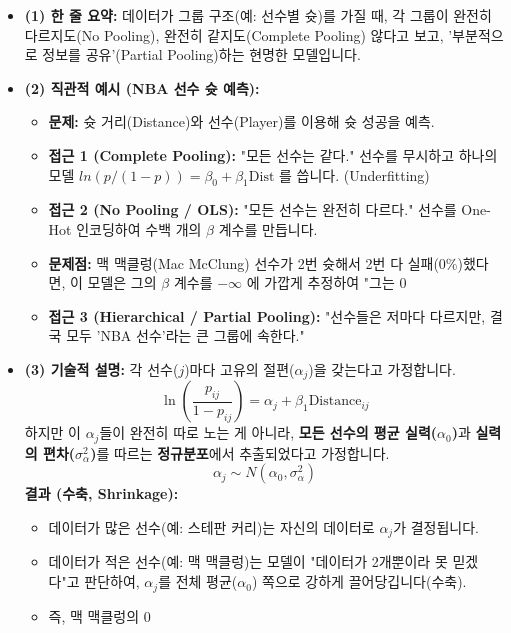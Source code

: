 \documentclass[11pt,a4paper]{book}
\theoremstyle{definition}
\begin{document}
\begin{itemize}
    \item \textbf{(1) 한 줄 요약:} 데이터가 그룹 구조(예: 선수별 슛)를 가질 때, 각 그룹이 완전히 다르지도(No Pooling), 완전히 같지도(Complete Pooling) 않다고 보고, '부분적으로 정보를 공유'(Partial Pooling)하는 현명한 모델입니다.
    \item \textbf{(2) 직관적 예시 (NBA 선수 슛 예측):}
    \begin{itemize}
        \item \textbf{문제:} 슛 거리(Distance)와 선수(Player)를 이용해 슛 성공을 예측.
        \item \textbf{접근 1 (Complete Pooling):} "모든 선수는 같다." 선수를 무시하고 하나의 모델 $ln(p/(1-p)) = \beta_0 + \beta_1 \text{Dist}$ 를 씁니다. (Underfitting)
        \item \textbf{접근 2 (No Pooling / OLS):} "모든 선수는 완전히 다르다." 선수를 One-Hot 인코딩하여 수백 개의 $\beta$ 계수를 만듭니다.
        \item \textbf{문제점:} 맥 맥클렁(Mac McClung) 선수가 2번 슛해서 2번 다 실패(0\%)했다면, 이 모델은 그의 $\beta$ 계수를 $-\infty$ 에 가깝게 추정하여 "그는 0%
        \item \textbf{접근 3 (Hierarchical / Partial Pooling):} "선수들은 저마다 다르지만, 결국 모두 'NBA 선수'라는 큰 그룹에 속한다."
    \end{itemize}
    \item \textbf{(3) 기술적 설명:} 각 선수($j$)마다 고유의 절편($\alpha_j$)을 갖는다고 가정합니다.
    $$ \ln(\frac{p_{ij}}{1-p_{ij}}) = \alpha_j + \beta_1 \text{Distance}_{ij} $$
    하지만 이 $\alpha_j$들이 완전히 따로 노는 게 아니라, \textbf{모든 선수의 평균 실력($\alpha_0$)}과 \textbf{실력의 편차($\sigma_{\alpha}^2$)}를 따르는 \textbf{정규분포}에서 추출되었다고 가정합니다.
    $$ \alpha_j \sim N(\alpha_0, \sigma_{\alpha}^2) $$
    \textbf{결과 (수축, Shrinkage):}
    \begin{itemize}
        \item 데이터가 많은 선수(예: 스테판 커리)는 자신의 데이터로 $\alpha_j$가 결정됩니다.
        \item 데이터가 적은 선수(예: 맥 맥클렁)는 모델이 "데이터가 2개뿐이라 못 믿겠다"고 판단하여, $\alpha_j$를 전체 평균($\alpha_0$) 쪽으로 강하게 끌어당깁니다(수축).
        \item 즉, 맥 맥클렁의 0%
    \end{itemize}
\end{itemize}
\end{document}
